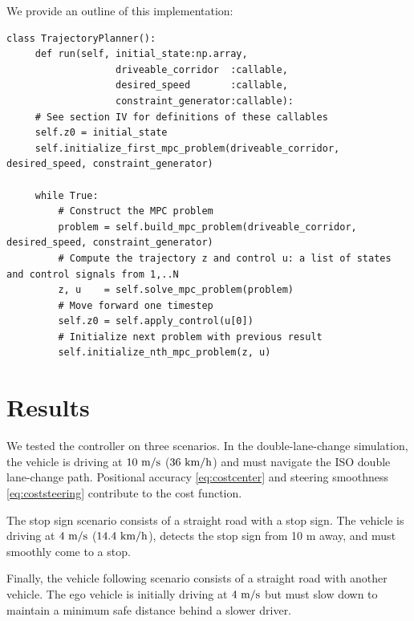 \documentclass[letterpaper, 10 pt, conference]{ieeeconf}  %
\begin{document}
 We provide an outline of this implementation:
 \begin{lstlisting}[caption={Nonlinear MPC controller using proposed API.},style=Python]
 class TrajectoryPlanner():
     def run(self, initial_state:np.array,
                   driveable_corridor  :callable,
                   desired_speed       :callable,
                   constraint_generator:callable):
     # See section IV for definitions of these callables
     self.z0 = initial_state
     self.initialize_first_mpc_problem(driveable_corridor, desired_speed, constraint_generator)
 
     while True:
         # Construct the MPC problem
         problem = self.build_mpc_problem(driveable_corridor, desired_speed, constraint_generator)
         # Compute the trajectory z and control u: a list of states and control signals from 1,..N
         z, u    = self.solve_mpc_problem(problem)
         # Move forward one timestep
         self.z0 = self.apply_control(u[0])
         # Initialize next problem with previous result
         self.initialize_nth_mpc_problem(z, u)
 \end{lstlisting}
 
 
 
 \section{Results} %
 We tested the controller on three scenarios. In the double-lane-change simulation, the vehicle is driving at $10\ \text{m}/\text{s}$ ($36\ \kmh$) and must navigate the ISO double lane-change path. Positional accuracy \eqref{eq:costcenter} and steering smoothness \eqref{eq:coststeering} contribute to the cost function.
 
 The stop sign scenario consists of a straight road with a stop sign. The vehicle is driving at $4\ \text{m}/\text{s}$ ($14.4\ \text{km}/\text{h}$), detects the stop sign from 10 m away, and must smoothly come to a stop.
 
Finally, the vehicle following scenario consists of a straight road with another vehicle. The ego vehicle is initially driving at $4\ \text{m}/\text{s}$ but must slow down to maintain a minimum safe distance behind a slower driver.
\end{document}
